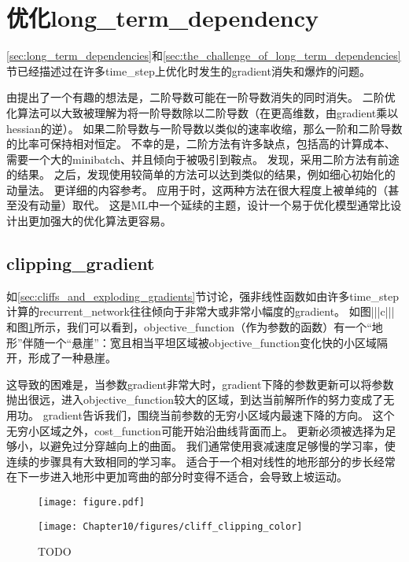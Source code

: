 \section{优化\gls{long_term_dependency}}
\label{sec:optimization_for_long_term_dependencies}
\ref{sec:long_term_dependencies}和\ref{sec:the_challenge_of_long_term_dependencies}节已经描述过在许多\gls{time_step}上优化时发生的\gls{gradient}消失和爆炸的问题。

由\cite{Martens+Sutskever-ICML2011}提出了一个有趣的想法是，二阶导数可能在一阶导数消失的同时消失。
二阶优化算法可以大致被理解为将一阶导数除以二阶导数（在更高维数，由\gls{gradient}乘以\gls{hessian}的逆）。
如果二阶导数与一阶导数以类似的速率收缩，那么一阶和二阶导数的比率可保持相对恒定。
不幸的是，二阶方法有许多缺点，包括高的计算成本、需要一个大的\gls{minibatch}、并且倾向于被吸引到鞍点。
\cite{Martens+Sutskever-ICML2011}发现，采用二阶方法有前途的结果。
之后，\cite{sutskeverimportance}发现使用较简单的方法可以达到类似的结果，例如细心初始化的动量法。
更详细的内容参考\cite{Sutskever-thesis2012}。
应用于时，这两种方法在很大程度上被单纯的（甚至没有动量）取代。
这是\gls{ML}中一个延续的主题，设计一个易于优化模型通常比设计出更加强大的优化算法更容易。


\subsection{\gls{clipping_gradient}}
\label{sec:clipping_gradients}
如\ref{sec:cliffs_and_exploding_gradients}节讨论，强非线性函数如由许多\gls{time_step}计算的\gls{recurrent_network}往往倾向于非常大或非常小幅度的\gls{gradient}。
如图|||c|||和图\ref{fig:chap10_cliff_clipping_color}所示，我们可以看到，\gls{objective_function}（作为参数的函数）有一个``地形''伴随一个``悬崖''：宽且相当平坦区域被\gls{objective_function}变化快的小区域隔开，形成了一种悬崖。

这导致的困难是，当参数\gls{gradient}非常大时，\gls{gradient}下降的参数更新可以将参数抛出很远，进入\gls{objective_function}较大的区域，到达当前解所作的努力变成了无用功。
\gls{gradient}告诉我们，围绕当前参数的无穷小区域内最速下降的方向。
这个无穷小区域之外，\gls{cost_function}可能开始沿曲线背面而上。
更新必须被选择为足够小，以避免过分穿越向上的曲面。
我们通常使用衰减速度足够慢的学习率，使连续的步骤具有大致相同的学习率。
适合于一个相对线性的地形部分的步长经常在下一步进入地形中更加弯曲的部分时变得不适合，会导致上坡运动。

\begin{figure}[!htb]
\ifOpenSource
\centerline{\texttt{[image: figure.pdf]}}
\else
\centerline{\texttt{[image: Chapter10/figures/cliff\_clipping\_color]}}
\fi
\caption{TODO}
\label{fig:chap10_cliff_clipping_color}
\end{figure}

